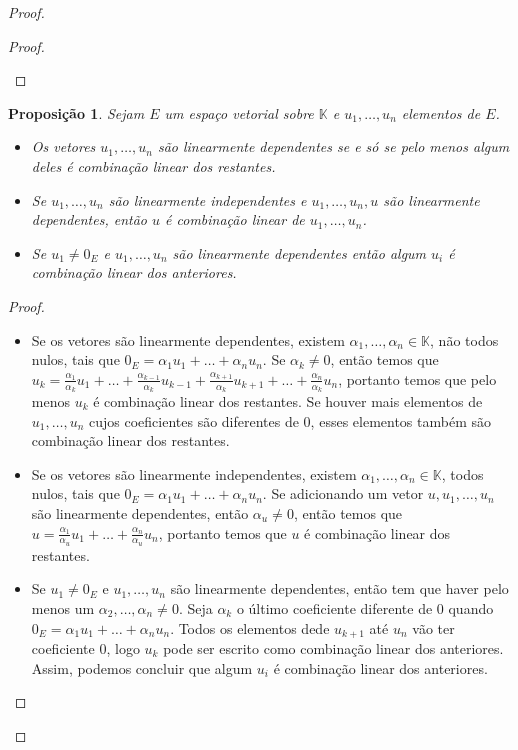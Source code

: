 \documentclass{article}
\newtheorem{proposition}{Proposição}[section]
\begin{document}
\begin{proof}
\begin{proof}
\begin{itemize}
	   \end{itemize} 
	\end{proof}


	\begin{proposition}
		Sejam $E$ um espaço vetorial sobre $\mathbb{K}$ e $u_1,\dots,u_n$ elementos de $E$.
		\begin{itemize}
    		\item Os vetores $u_1,\dots,u_n$ são linearmente dependentes se e só se pelo menos algum deles é combinação linear dos restantes.
    		\item Se $u_1,\dots,u_n$ são linearmente independentes e $u_1,\dots,u_n,u$ são linearmente dependentes, então $u$ é combinação linear de $u_1,\dots,u_n$.
    		\item Se $u_1\neq0_E$ e $u_1,\dots,u_n$ são linearmente dependentes então algum $u_i$ é combinação linear dos anteriores.
		\end{itemize}

	\end{proposition}

	\begin{proof}
	    \begin{itemize}
		    \item Se os vetores são linearmente dependentes, existem $\alpha_1,\dots,\alpha_n \in \mathbb{K}$, não todos nulos, tais que $0_E=\alpha_1 u_1+\dots+\alpha_n u_n$. Se $\alpha_k \neq 0$, então temos que $u_k=\frac{\alpha_1}{\alpha_k}u_1+\dots+\frac{\alpha_{k-1}}{\alpha_{k}}u_{k-1}+\frac{\alpha_{k+1}}{\alpha_{k}}u_{k+1}+\dots+\frac{\alpha_n}{\alpha_k}u_n$, portanto temos que pelo menos $u_k$ é combinação linear dos restantes. Se houver mais elementos de $u_1,\dots,u_n$ cujos coeficientes são diferentes de 0, esses elementos também são combinação linear dos restantes.
		\item Se os vetores são linearmente independentes, existem $\alpha_1,\dots,\alpha_n \in \mathbb{K}$, todos nulos, tais que $0_E=\alpha_1 u_1+\dots+\alpha_n u_n$. Se adicionando um vetor $u, u_1,\dots,u_n$ são linearmente dependentes, então $\alpha_u \neq 0$, então temos que $u=\frac{\alpha_1}{\alpha_u}u_1+\dots+\frac{\alpha_n}{\alpha_u}u_n$, portanto temos que $u$ é combinação linear dos restantes. 
		\item Se $u_1\neq0_E$ e $u_1,\dots,u_n$ são linearmente dependentes, então tem que haver pelo menos um $\alpha_2,\dots,\alpha_n \neq 0$. Seja $\alpha_k$ o último coeficiente diferente de 0 quando $0_E=\alpha_1 u_1+\dots+\alpha_n u_n$. Todos os elementos dede $u_{k+1}$ até $u_n$ vão ter coeficiente 0, logo $u_k$ pode ser escrito como combinação linear dos anteriores. Assim, podemos concluir que algum $u_i$ é combinação linear dos anteriores.
	    \end{itemize}
	\end{proof}


\end{proof}
\end{document}
